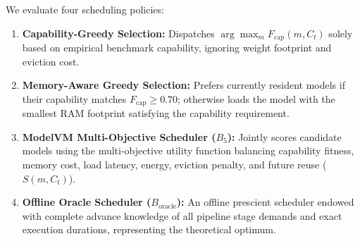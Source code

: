 We evaluate four scheduling policies:
\begin{enumerate}
    \item \textbf{Capability-Greedy Selection:} Dispatches $\arg\max_{m} F_{\text{cap}}(m, C_t)$ solely based on empirical benchmark capability, ignoring weight footprint and eviction cost.
    \item \textbf{Memory-Aware Greedy Selection:} Prefers currently resident models if their capability matches $F_{\text{cap}} \ge 0.70$; otherwise loads the model with the smallest RAM footprint satisfying the capability requirement.
    \item \textbf{ModelVM Multi-Objective Scheduler ($B_5$):} Jointly scores candidate models using the multi-objective utility function balancing capability fitness, memory cost, load latency, energy, eviction penalty, and future reuse ($S(m, C_t)$).
    \item \textbf{Offline Oracle Scheduler ($B_{\text{oracle}}$):} An offline prescient scheduler endowed with complete advance knowledge of all pipeline stage demands and exact execution durations, representing the theoretical optimum.
\end{enumerate}

\begin{table}[t]
\small
\centering
\caption{Scheduler Policy Performance and Regret Analysis on Canonical 5-Stage Benchmark ($n=10$ matched trials, $\mathcal{B}_{\text{RAM}} = 8.0$\,GB). Values denote mean [bootstrap 95\% CI]. Goodput is defined as $(\text{Completed Stages} \times Q) / L_{\text{total}}$ (stages/sec); Regret is $\Delta_{\text{oracle}} = (\text{Cost}_{\text{sched}} - \text{Cost}_{\text{oracle}}) / \text{Cost}_{\text{oracle}}$ evaluated against the exact finite-state DP offline oracle.}
\label{tab:exp_h3_scheduler}
\end{table}


